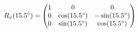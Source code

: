 \documentclass[preview]{standalone}
\begin{document}
\begin{align*}
\special{dvisvgm:raw <g id='unique000'>}R_x(15.5^\circ) = \begin{pmatrix} 1 & 0 & 0 \\ 0 & \cos(15.5^\circ) & -\sin(15.5^\circ) \\ 0 & \sin(15.5^\circ) & \cos(15.5^\circ) \end{pmatrix}\special{dvisvgm:raw </g>}
\end{align*}
\end{document}
